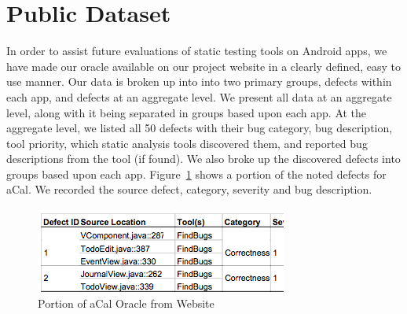 \documentclass{sig-alternate}
\newcommand{\todo}[1]{\textcolor{cyan}{\textbf{[#1]}}}
\begin{document}
\section{Public Dataset}
\label{sec:publicdataset}


In order to assist future evaluations of static testing tools on Android apps, we have made our oracle available on our project website in a clearly defined, easy to use manner. Our data is broken up into into two primary groups, defects within each app, and defects at an aggregate level. We present all data at an aggregate level, along with it being separated in groups based upon each app. At the aggregate level, we listed all 50 defects with their bug category, bug description, tool priority, which static analysis tools discovered them, and reported bug descriptions from the tool (if found). We also broke up the discovered defects into groups based upon each app. Figure~\ref{fig:aCalOracle} shows a portion of the noted defects for aCal. We recorded the source defect, category, severity and bug description.




%

\begin{figure}
\centering
\includegraphics{images/oracle_aCal1_small.png}
\caption{Portion of aCal Oracle from Website}
\label{fig:aCalOracle}
\end{figure}
\end{document}
